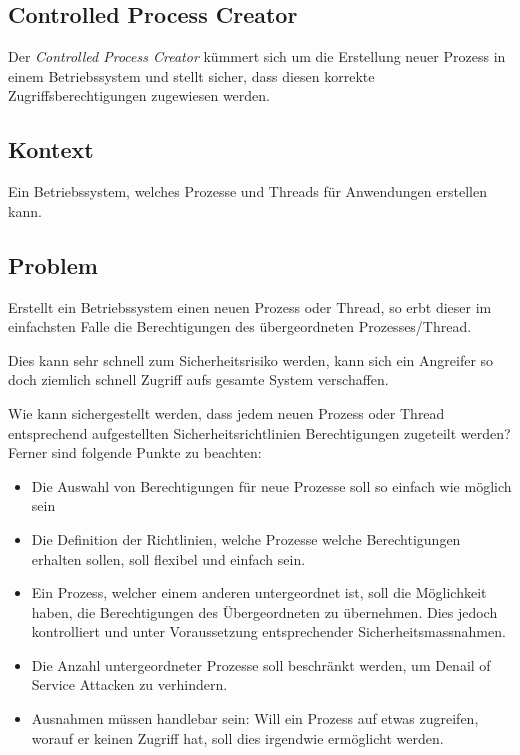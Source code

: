 \subsection{Controlled Process Creator}
\label{sec:controlled-process-creator}

Der \emph{Controlled Process Creator} kümmert sich um die Erstellung neuer Prozess in einem Betriebssystem und stellt sicher, dass diesen korrekte Zugriffsberechtigungen zugewiesen werden.

\subsection*{Kontext}
Ein Betriebssystem, welches Prozesse und Threads für Anwendungen erstellen kann.

\subsection*{Problem}
Erstellt ein Betriebssystem einen neuen Prozess oder Thread, so erbt dieser im einfachsten Falle die Berechtigungen des übergeordneten Prozesses/Thread.

Dies kann sehr schnell zum Sicherheitsrisiko werden, kann sich ein Angreifer so doch ziemlich schnell Zugriff aufs gesamte System verschaffen.

Wie kann sichergestellt werden, dass jedem neuen Prozess oder Thread entsprechend aufgestellten Sicherheitsrichtlinien Berechtigungen zugeteilt werden? Ferner sind folgende Punkte zu beachten:

\begin{itemize}
	\item Die Auswahl von Berechtigungen für neue Prozesse soll so einfach wie möglich sein
	\item Die Definition der Richtlinien, welche Prozesse welche Berechtigungen erhalten sollen, soll flexibel und einfach sein.
	\item Ein Prozess, welcher einem anderen untergeordnet ist, soll die Möglichkeit haben, die Berechtigungen des Übergeordneten zu übernehmen. Dies jedoch kontrolliert und unter Voraussetzung entsprechender Sicherheitsmassnahmen.
	\item Die Anzahl untergeordneter Prozesse soll beschränkt werden, um Denail of Service Attacken zu verhindern.
	\item Ausnahmen müssen handlebar sein: Will ein Prozess auf etwas zugreifen, worauf er keinen Zugriff hat, soll dies irgendwie ermöglicht werden.
\end{itemize}



